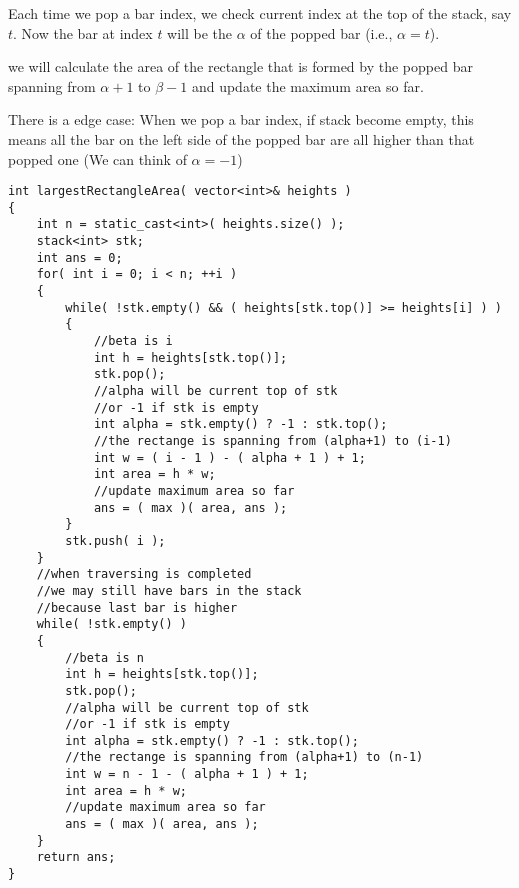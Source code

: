 Each time we pop a bar index, we check current index at the top of the stack, say $t$. Now the bar at index $t$ will be the $\alpha$ of the popped bar (i.e., $\alpha=t$). 

we will calculate the area of the rectangle that is formed by the popped bar spanning from $\alpha+1$ to $\beta-1$ and update the maximum area so far.

There is a edge case: When we pop a bar index, if stack become empty, this means all the bar on the left side of the popped bar are all higher than 
that popped one (We can think of $\alpha=-1$)

\setcounter{lstlisting}{0}
\begin{lstlisting}[style=customc, caption={Stack}]
int largestRectangleArea( vector<int>& heights )
{
    int n = static_cast<int>( heights.size() );
    stack<int> stk;
    int ans = 0;
    for( int i = 0; i < n; ++i )
    {
        while( !stk.empty() && ( heights[stk.top()] >= heights[i] ) )
        {
            //beta is i
            int h = heights[stk.top()];
            stk.pop();
            //alpha will be current top of stk
            //or -1 if stk is empty
            int alpha = stk.empty() ? -1 : stk.top();
            //the rectange is spanning from (alpha+1) to (i-1)
            int w = ( i - 1 ) - ( alpha + 1 ) + 1;
            int area = h * w;
            //update maximum area so far
            ans = ( max )( area, ans );
        }
        stk.push( i );
    }
    //when traversing is completed
    //we may still have bars in the stack
    //because last bar is higher
    while( !stk.empty() )
    {
        //beta is n
        int h = heights[stk.top()];
        stk.pop();
        //alpha will be current top of stk
        //or -1 if stk is empty
        int alpha = stk.empty() ? -1 : stk.top();
        //the rectange is spanning from (alpha+1) to (n-1)
        int w = n - 1 - ( alpha + 1 ) + 1;
        int area = h * w;
        //update maximum area so far
        ans = ( max )( area, ans );
    }
    return ans;
}
\end{lstlisting}
